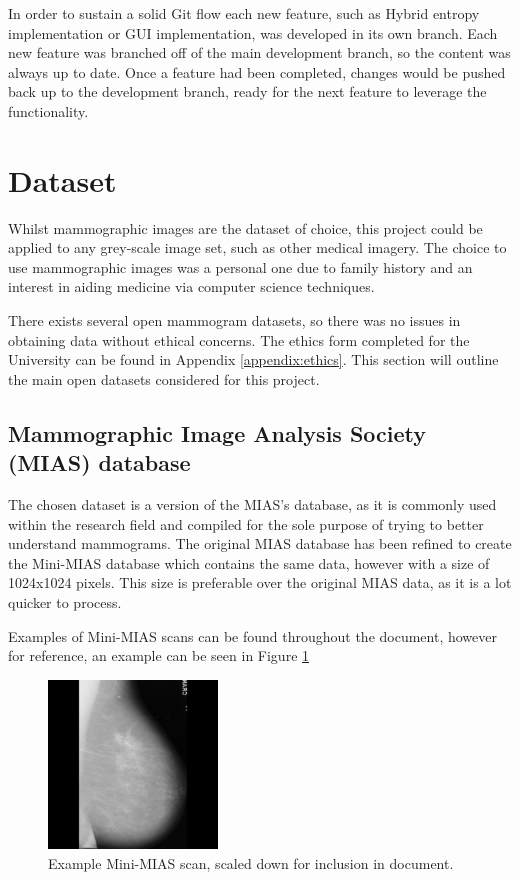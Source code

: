 In order to sustain a solid Git flow each new feature, such as Hybrid entropy implementation or \acrshort{GUI} implementation, was developed in its own branch. Each new feature was branched off of the  main development branch, so the content was always up to date. Once a feature had been completed, changes would be pushed back up to the development branch, ready for the next feature to leverage the functionality.

\section{Dataset}

Whilst mammographic images are the dataset of choice, this project could be applied to any grey-scale image set, such as other medical imagery. The choice to use mammographic images was a personal one due to family history and an interest in aiding medicine via computer science techniques.

There exists several open mammogram datasets, so there was no issues in obtaining data without ethical concerns. The ethics form completed for the University can be found in Appendix \ref{appendix:ethics}. This section will outline the main open datasets considered for this project.

\subsection{Mammographic Image Analysis Society (MIAS) database}

The chosen dataset is a version of the \acrfull{MIAS}'s database, as it is commonly used within the research field and compiled for the sole purpose of trying to better understand mammograms. The original \acrshort{MIAS} database has been refined to create the Mini-\acrshort{MIAS} database which contains the same data, however with a size of 1024x1024 pixels. This size is preferable over the original \acrshort{MIAS} data, as it is a lot quicker to process.

Examples of Mini-\acrshort{MIAS} scans can be found throughout the document, however for reference, an example can be seen in Figure \ref{fig:mini-mias}

\begin{figure}[H]
  \centering
  \includegraphics[width=0.4\textwidth]{Chapter2/tools/mias.jpg}
  \caption{Example Mini-MIAS scan, scaled down for inclusion in document.}
  \label{fig:mini-mias}
\end{figure}

